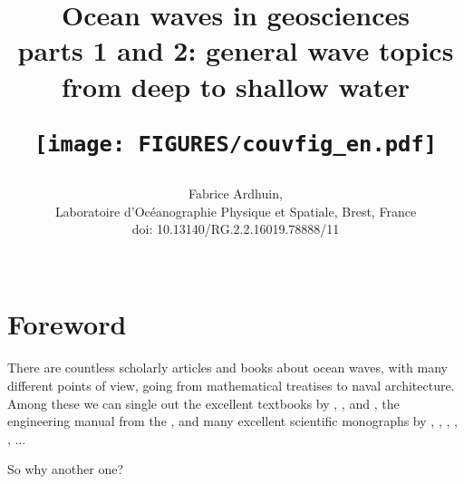 \documentclass[a4paper]{book}  %
\begin{document}
\title{{\Huge Ocean waves in geosciences }
{\Large \\  parts 1 and 2: general wave topics from deep to shallow water}
 \vspace{0.1cm}\\
   \centerline{\texttt{[image: FIGURES/couvfig\_en.pdf]}}}
\author{Fabrice Ardhuin, \\
Laboratoire d'Oc{\'e}anographie Physique et Spatiale, Brest,
France \\
doi:  10.13140/RG.2.2.16019.78888/11 \\
\vspace{0.1cm}\\
} \maketitle
 \cleardoublepage
{}

\setcounter{page}{3}

\tableofcontents
\cleardoublepage


\setcounter{chapter}{0}

\chapter*{Foreword}\label{foreword}
There are countless scholarly articles and books about ocean waves, with many different points of view, going from 
mathematical treatises to naval architecture. Among these we can single out the excellent textbooks by 
\cite{Kinsman1965}, \cite{Dean&Dalrymple1991},  
and \cite{Holthuijsen2007}, the engineering manual from the \cite{USACE2002}, and many excellent scientific 
monographs by \cite{Phillips1977}, \cite{Dingemans1997a}, \cite{Young1999}, \cite{Lavrenov2003}, \cite{Janssen2004}, \cite{Lannes2013} ...  

So why another one? 
\end{document}
